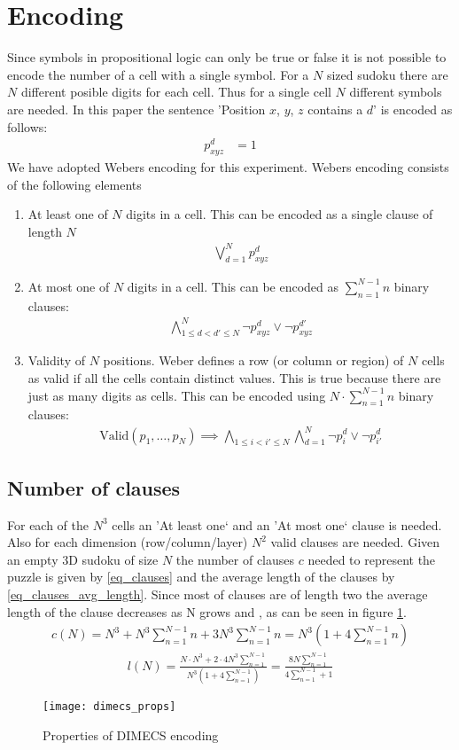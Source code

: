 \section{Encoding}
Since symbols in propositional logic can only be true or false it is not possible to encode the number of a cell with a single symbol. For a $N$ sized sudoku there are $N$ different posible digits for each cell. Thus for a single cell $N$ different symbols are needed. In this paper the sentence 'Position $x$, $y$, $z$ contains a $d$' is encoded as follows:
\begin{align}
  p_{xyz}^d &= 1
\end{align}
We have adopted Webers \cite{weber2005sat} encoding for this experiment. Webers encoding consists of the following elements
\begin{enumerate}
  \item At least one of $N$ digits in a cell. This can be encoded as a single clause of length $N$
    \begin{align}
      \bigvee_{d=1}^N p_{xyz}^d
    \end{align}
  \item At most one of $N$ digits in a cell. This can be encoded as $\sum_{n=1}^{N-1}n$ binary clauses:
    \begin{align}
      \bigwedge_{1 \leq d < d' \leq N}^N \neg p_{xyz}^d \vee \neg p_{xyz}^{d'}
    \end{align}
  \item Validity of $N$ positions. Weber defines a row (or column or region) of $N$ cells as valid if all the cells contain distinct values. This is true because there are just as many digits as cells. This can be encoded using $N \cdot \sum_{n=1}^{N-1}n$ binary clauses:
    \begin{align}
      \text{Valid}(p_1,\dots,p_N) \implies \bigwedge_{1 \leq i < i' \leq N}\bigwedge_{d=1}^N \neg p_{i}^d \vee \neg p_{i'}^{d}
    \end{align}
\end{enumerate}

\subsection{Number of clauses}
For each of the $N^3$ cells an 'At least one` and an 'At most one` clause is needed. Also for each dimension (row/column/layer) $N^2$ valid clauses are needed. Given an empty 3D sudoku of size $N$ the number of clauses $c$ needed to represent the puzzle is given by \ref{eq_clauses} and the average length of the clauses by \ref{eq_clauses_avg_length}. Since most of clauses are of length two the average length of the clause decreases as N grows and , as can be seen in figure \ref{fig_dimecs_props}.
\begin{align}
  \label{eq_clauses}
  c(N) = N^3 + N^3 \sum_{n=1}^{N-1}n + 3N^3\sum_{n=1}^{N-1}n = N^3(1 + 4\sum_{n=1}^{N-1}n)
\end{align}
\begin{align}
  \label{eq_clauses_avg_length}
  l(N) = \frac{N\cdot N^3 + 2\cdot4 N^3 \sum_{n=1}^{N-1}}{N^3(1 + 4\sum_{n=1}^{N-1})} = \frac{8N\sum_{n=1}^{N-1}}{4\sum_{n=1}^{N-1}+1}
\end{align}

\begin{figure}
  \centering
  \texttt{[image: dimecs\_props]}
  \label{fig_dimecs_props}
  \caption{Properties of DIMECS encoding}
\end{figure}

